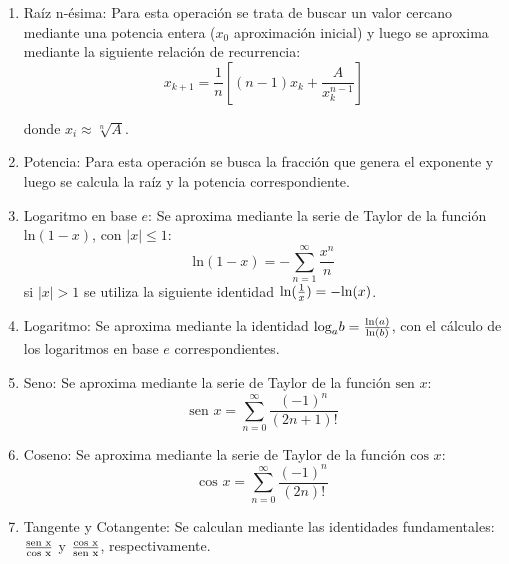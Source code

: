 \documentclass[a4paper,10pt,twocolumn]{article}
\begin{document}
\begin{enumerate}
	\item Raíz n-ésima: Para esta operación se trata de buscar un valor cercano mediante una potencia entera ($x_0$ aproximación inicial) y luego se aproxima mediante la siguiente relación de recurrencia:
	      \begin{equation}
		      x_ {k + 1} = {\frac {1} {n}} \left [{(n-1) x_ {k} + {\frac {A} {x_ {k} ^ {n-1}}}} \right]
	      \end{equation}
	      
	      donde $x_i\approx \sqrt[n]{A}$.
	      
	\item Potencia: Para esta operación se busca la fracción que genera el exponente y luego se calcula la raíz y la potencia correspondiente.
	      
	\item Logaritmo en base $e$: Se aproxima mediante la serie de Taylor de la función $\text{ln}(1-x)$, con $|x| \leq 1$:
	      \begin{equation}
		      \text{ln}(1-x)=-\sum _{n=1}^{\infty }{\frac {x^{n}}{n}}
	      \end{equation}
	      si $|x| > 1$ se utiliza la siguiente identidad $\text{ln}({1\over x})=-\text{ln}(x)$.
	      
	\item Logaritmo: Se aproxima mediante la identidad $\text{log}_a b={\text{ln}(a)\over \text{ln}(b)}$, con el cálculo de los logaritmos en base $e$ correspondientes.
	      
	\item Seno: Se aproxima mediante la serie de Taylor de la función $\text{sen }x$:
	      \begin{equation}
		      \text{sen } x=\sum _{n=0}^{\infty }{\frac {(-1)^{n}}{(2n+1)!}}
	      \end{equation}
	      
	\item Coseno: Se aproxima mediante la serie de Taylor de la función $\text{cos }x$:
	      \begin{equation}
		      \text{cos } x=\sum _{n=0}^{\infty }{\frac {(-1)^{n}}{(2n)!}}
	      \end{equation}
	      
	\item Tangente y Cotangente: Se calculan mediante las identidades fundamentales: $\text{sen x}\over \text{cos x}$ y $\text{cos x}\over \text{sen x}$, respectivamente.
	      

\end{enumerate}
\end{document}
